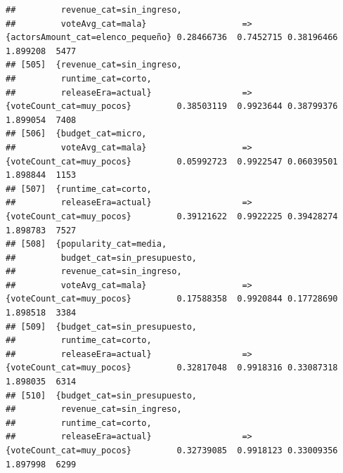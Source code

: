\documentclass[
]{article}
\begin{document}
\begin{verbatim}
##         revenue_cat=sin_ingreso,                                                                                                
##         voteAvg_cat=mala}                   => {actorsAmount_cat=elenco_pequeño} 0.28466736  0.7452715 0.38196466 1.899208  5477
## [505]  {revenue_cat=sin_ingreso,                                                                                                
##         runtime_cat=corto,                                                                                                      
##         releaseEra=actual}                  => {voteCount_cat=muy_pocos}         0.38503119  0.9923644 0.38799376 1.899054  7408
## [506]  {budget_cat=micro,                                                                                                       
##         voteAvg_cat=mala}                   => {voteCount_cat=muy_pocos}         0.05992723  0.9922547 0.06039501 1.898844  1153
## [507]  {runtime_cat=corto,                                                                                                      
##         releaseEra=actual}                  => {voteCount_cat=muy_pocos}         0.39121622  0.9922225 0.39428274 1.898783  7527
## [508]  {popularity_cat=media,                                                                                                   
##         budget_cat=sin_presupuesto,                                                                                             
##         revenue_cat=sin_ingreso,                                                                                                
##         voteAvg_cat=mala}                   => {voteCount_cat=muy_pocos}         0.17588358  0.9920844 0.17728690 1.898518  3384
## [509]  {budget_cat=sin_presupuesto,                                                                                             
##         runtime_cat=corto,                                                                                                      
##         releaseEra=actual}                  => {voteCount_cat=muy_pocos}         0.32817048  0.9918316 0.33087318 1.898035  6314
## [510]  {budget_cat=sin_presupuesto,                                                                                             
##         revenue_cat=sin_ingreso,                                                                                                
##         runtime_cat=corto,                                                                                                      
##         releaseEra=actual}                  => {voteCount_cat=muy_pocos}         0.32739085  0.9918123 0.33009356 1.897998  6299

\end{verbatim}
\end{document}

